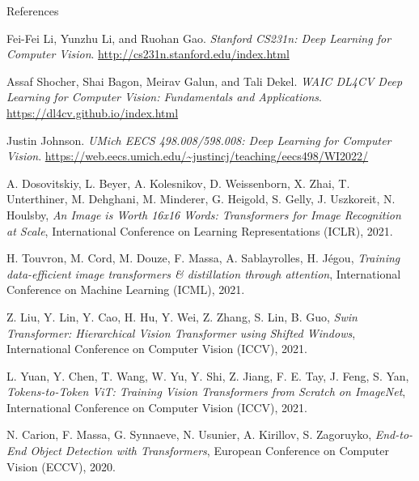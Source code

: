 \begin{frame}[allowframebreaks]{References}

\begin{thebibliography}{9}

Fei-Fei Li, Yunzhu Li, and Ruohan Gao. 
\textit{Stanford CS231n: Deep Learning for Computer Vision}. 
\url{http://cs231n.stanford.edu/index.html}

Assaf Shocher, Shai Bagon, Meirav Galun, and Tali Dekel. 
\textit{WAIC DL4CV Deep Learning for Computer Vision: Fundamentals and Applications}. 
\url{https://dl4cv.github.io/index.html}

Justin Johnson. 
\textit{UMich EECS 498.008/598.008: Deep Learning for Computer Vision}. 
\url{https://web.eecs.umich.edu/~justincj/teaching/eecs498/WI2022/}

A. Dosovitskiy, L. Beyer, A. Kolesnikov, D. Weissenborn, X. Zhai, T. Unterthiner, M. Dehghani, M. Minderer, G. Heigold, S. Gelly, J. Uszkoreit, N. Houlsby,
\textit{An Image is Worth 16x16 Words: Transformers for Image Recognition at Scale},
International Conference on Learning Representations (ICLR), 2021.

H. Touvron, M. Cord, M. Douze, F. Massa, A. Sablayrolles, H. Jégou,
\textit{Training data-efficient image transformers \& distillation through attention},
International Conference on Machine Learning (ICML), 2021.

Z. Liu, Y. Lin, Y. Cao, H. Hu, Y. Wei, Z. Zhang, S. Lin, B. Guo,
\textit{Swin Transformer: Hierarchical Vision Transformer using Shifted Windows},
International Conference on Computer Vision (ICCV), 2021.

L. Yuan, Y. Chen, T. Wang, W. Yu, Y. Shi, Z. Jiang, F. E. Tay, J. Feng, S. Yan,
\textit{Tokens-to-Token ViT: Training Vision Transformers from Scratch on ImageNet},
International Conference on Computer Vision (ICCV), 2021.

N. Carion, F. Massa, G. Synnaeve, N. Usunier, A. Kirillov, S. Zagoruyko,
\textit{End-to-End Object Detection with Transformers},
European Conference on Computer Vision (ECCV), 2020.

\end{thebibliography}
\end{frame}